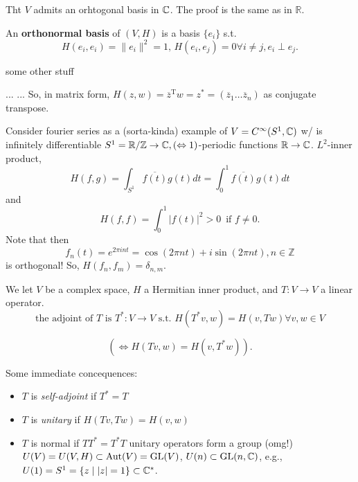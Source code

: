 \documentclass{report}
\begin{document}
\begin{theorem}{Th}{t}
  \( V \) admits an orhtogonal basis in \( \CC\). The proof is the same as in \( \mathbb{R} \). 
\end{theorem}

\begin{definition}{}{}
  An \textbf{orthonormal basis} of \( (V,H) \) is a basis \( \{e_i\}   \) s.t. 
  \begin{displaymath}
    H(e_i,e_i)=\|e_i\|^2 =1, \, H(e_i,e_j)=0 \forall i\neq j, e_i \perp e_j. 
  \end{displaymath}
  
\end{definition}

some other stuff


...
...
So, in matrix form, \( H(z,w)=\overline{z}^{\text{T}}w =z^*=(\overline{z}_{1}\ldots \overline{z}_n) \) as conjugate transpose. 

Consider fourier series as a (sorta-kinda) example of \( V=C^{\infty} (S^1,\CC) \) w/ is infinitely differentiable \( S^1=\mathbb{R}/\mathbb{Z} \to  \CC, (\iff 1)\)-periodic functions \( \mathbb{R} \to  \CC \). \( L^2 \)-inner product, \[
  H(f,g)=\int_{S^1}\overline{f(t)} g(t)dt = \int_0^1 \overline{f(t)} g(t)dt\]
  and 
  \[
    H(f,f) = \int _0^1|f(t)|^2 > 0\,  \text{ if } f\neq 0
  .\] 
  Note that then \[ f_n(t) =e^{2 \pi  i nt} = \cos (2 \pi  nt) + i \sin  (2 \pi  nt), n \in  \mathbb{Z}\] is orthogonal! So, \( H(f_n,f_m)=\delta _{n,m}  \). 


  \begin{definition}{}{}
 We let \( V \) be a complex space, \( H \) a Hermitian inner product, and \( T:V \to  V \) a linear operator.
  \begin{displaymath}
    \text{the adjoint of } T \text{ is } T^* : V \to  V \text{ s.t. } H(T^*v,w)=H(v,Tw) \forall v,w \in  V
  \end{displaymath}

  \[(\iff H(Tv,w)=H(v,T^*w)) .\] 


\end{definition}{}{}
Some immediate concequences:
\begin{itemize}
  \item \( T \) is \textit{self-adjoint} if \( T^*=T \)
  \item \(  T \) is \textit{unitary} if \( H(Tv,Tw)=H(v,w) \)
  \item \( T \) is normal if \( TT^*=T^*T \)
    unitary operators form a group (omg!) \( U(V)=U(V,H) \subset \operatorname{Aut}(V) = \text{GL}(V) \), \( U(n) \subset  \text{GL}(n,\CC) \), e.g., \( U(1)=S^1=\{z \mid  |z| = 1\} \subset  \CC[*]  \). 
\end{itemize}
\end{document}
